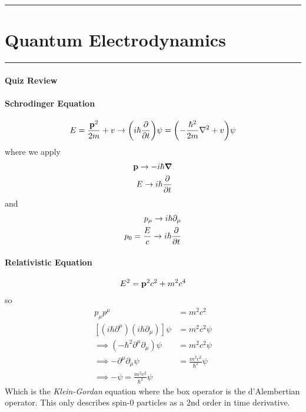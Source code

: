 \documentclass[../main.tex]{subfiles}
\begin{document}
\hrule
\section{Quantum Electrodynamics}
\hrule \vspace{10px}


\paragraph*{Quiz Review} 
\paragraph*{Schrodinger Equation}
\begin{align*}
    E = \frac{\vb p^2}{2m} + v \to \qt(i\hbar \pdv{t})\psi = \qt(-\frac{\hbar^2}{2m} \laplacian + v) \psi
\end{align*}
where we apply
\begin{align*}
    \vb p \to -i\hbar \grad \\
    E \to i\hbar \pdv{t}
\end{align*}
and
\begin{align*}
    p_\mu \to i\hbar \partial_\mu \\
    p_0 = \frac{E}{c} \to i\hbar \pdv{t} \\
\end{align*}
\paragraph*{Relativistic Equation}
\begin{align*}
    E^2 = \vb p^2 c^2 + m^2 c^4
\end{align*}
so
\begin{align*}
    p_\mu p^\mu &= m^2 c^2 \\
    [(i\hbar \partial^\mu) (i\hbar \partial_\mu)] \psi &= m^2 c^2 \psi \\
    \implies (-\hbar^2 \partial^\mu \partial_\mu) \psi &= m^2 c^2 \psi \\
    \implies -\partial^\mu \partial_\mu \psi &= \frac{m^2 c^2}{\hbar^2} \psi \\
    \implies - \boxed{} \psi = \frac{m^2 c^2}{\hbar^2} \psi
\end{align*}
Which is the \emph{Klein-Gordan} equation where the box operator is the d'Alembertian operator. This
only describes spin-0 particles as a 2nd order in time derivative.
\end{document}
